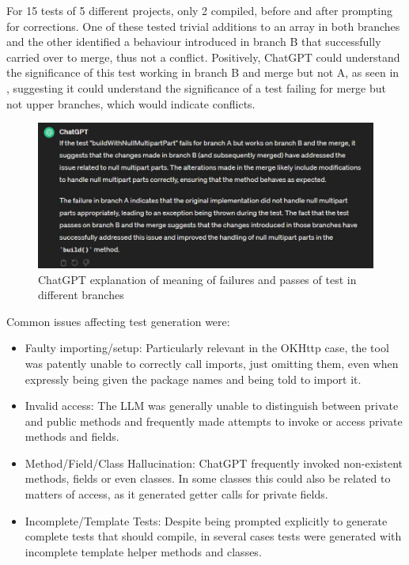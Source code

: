 For 15 tests of 5 different projects, only 2 compiled, before and after prompting for corrections. One of these tested trivial additions to an array in both branches and the other identified a behaviour introduced in branch B that successfully carried over to merge, thus not a conflict. Positively, ChatGPT could understand the significance of this test working in branch B and merge but not A, as seen in , suggesting it could understand the significance of a test failing for merge but not upper branches, which would indicate conflicts.

\begin{figure}
    \centering
    \includegraphics[width=1\linewidth]{figures/testexplain.jpg}
    \caption{ChatGPT explanation of meaning of failures and passes of test in different branches}
    \label{fig:testexplain}
\end{figure}

Common issues affecting test generation were:

\begin{itemize}
  \item Faulty importing/setup: Particularly relevant in the OKHttp case, the tool was patently unable to correctly call imports, just omitting them, even when expressly being given the package names and being told to import it.
  \item Invalid access: The LLM was generally unable to distinguish between private and public methods and frequently made attempts to invoke or access private methods and fields.
  \item Method/Field/Class Hallucination: ChatGPT frequently invoked non-existent methods, fields or even classes. In some classes this could also be related to matters of access, as it generated getter calls for private fields.
  \item Incomplete/Template Tests: Despite being prompted explicitly to generate complete tests that should compile, in several cases tests were generated with incomplete template helper methods and classes.
\end{itemize}

